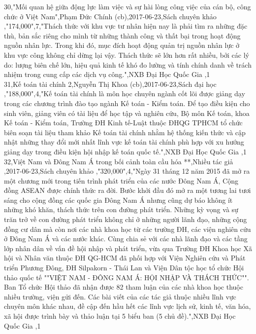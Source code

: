\documentclass[a4paper]{article}
\begin{document}
30,"Mối quan hệ giữa động lực làm việc và sự hài lòng công việc của cán bộ, công chức ở Việt Nam",Phạm Đức Chính (cb),2017-06-23,Sách chuyên khảo ,"174,000",7,"Thách thức với khu vực tư nhân hiện nay là phải tìm ra những đặc thù, bản sắc riêng cho mình từ những thành công và thất bại trong hoạt động nguồn nhân lực. Trong khi đó, mục đích hoạt động quản trị nguồn nhân lực ở khu vực công không chỉ dừng lại vậy. Thách thức sẽ lớn hơn rất nhiều, bởi các lý do: lượng biên chế lớn, hiệu quả kinh tế khó đo lường và tính chính danh về trách nhiệm trong cung cấp các dịch vụ công.",NXB Đại Học Quốc Gia ,1\\
31,Kế toán tài chính 2,Nguyễn Thị Khoa (cb),2017-06-23,Sách đại học ,"188,000",4,"Kế toán tài chính là môn học chuyên ngành cốt lõi được giảng dạy trong các chương trình đào tạo ngành Kế toán - Kiểm toán. Để tạo điều kiện cho sinh viên, giảng viên có tài liệu để học tập và nghiên cứu, Bộ môn Kế toán, khoa Kế toán - Kiểm toán, Trường ĐH Kinh tế-Luật thuộc ĐHQG TPHCM tổ chức biên soạn tài liệu tham khảo Kế toán tài chính nhằm hệ thống kiến thức và cập nhật những thay đổi mới nhất lĩnh vực kế toán tài chính phù hợp với xu hướng giảng dạy trong điều kiện hội nhập kế toán quốc tế.",NXB Đại Học Quốc Gia ,1\\
32,Việt Nam và Đông Nam Á trong bối cảnh toàn cầu hóa **,Nhiều tác giả ,2017-06-23,Sách chuyên khảo ,"320,000",4,"Ngày 31 tháng 12 năm 2015 đã mở ra một chương mới trong tiến trình phát triển của các nước Đông Nam Á, Cộng đồng ASEAN được chính thức ra đời. Bước khởi đầu đó mở ra một tương lai tươi sáng cho cộng đồng các quốc gia Đông Nam Á nhưng cũng dự báo không ít những khó khăn, thách thức trên con đường phát triển. Những kỳ vọng và sự trăn trở về con đường phát triển không chỉ ở những người lãnh đạo, những cộng đồng cư dân mà còn nơi các nhà khoa học từ các trường ĐH, các viện nghiên cứu ở Đông Nam Á và các nước khác. Cùng chia sẻ với các nhà lãnh đạo và các tầng lớp nhân dân về vấn đề hội nhập và phát triển, vừa qua Trường ĐH Khoa học Xã hội và Nhân văn thuộc ĐH QG-HCM đã phối hợp với Viện Nghiên cứu và Phát triển Phương Đông, ĐH Silpakorn - Thái Lan và Viện Dân tộc học tổ chức Hội thảo quốc tế ""VIỆT NAM - ĐÔNG NAM Á: HỘI NHẬP VÀ THÁCH THỨC"". Ban Tổ chức Hội thảo đã nhận được 82 tham luận của các nhà khoa học thuộc nhiều trường, viện gửi đến. Các bài viết của các tác giả thuộc nhiều lĩnh vực chuyên môn khác nhau, đề cập đến hầu hết các lĩnh vực lịch sử, kinh tế, văn hóa, xã hội được trình bày và thảo luận tại 5 biểu ban (5 chủ đề).",NXB Đại Học Quốc Gia ,1\\
\end{document}
